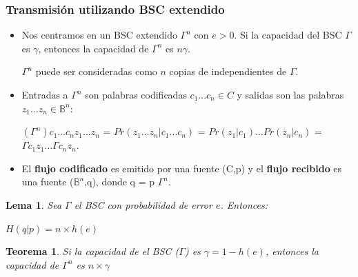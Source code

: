 \documentclass{beamer}
\theoremstyle{plain}
\newtheorem{teorema} [Teorema] {Teorema}
\newtheorem{lema} [theorem] {Lema}
\theoremstyle{example}
\theoremstyle{example}
\begin{document}
\begin{frame} \frametitle{Transmisión utilizando BSC extendido} \footnotesize  
\begin{itemize} 

\item Nos centramos en un BSC extendido $\Gamma^n$ con $e > 0$. Si la capacidad del BSC $\Gamma$  es $\gamma$, entonces la capacidad de $\Gamma^n$ es $n\gamma$.  

$\Gamma^n$ puede ser consideradas como $n$ copias de independientes de $\Gamma$.

\item  Entradas a $\Gamma^n$ son palabras codificadas $c_1 \ldots c_n \in C$ y  salidas son las palabras  $z_1 \ldots z_n \in \mathbb{B}^n$:
\begin{center}
$(\Gamma^n){c_1 \ldots c_n z_1 \ldots z_n}$ = $Pr(z_1 \ldots z_n | c_1 \ldots c_n)$ = $Pr(z_1 | c_1) \ldots Pr(z_n | c_n)$
= $\Gamma{c_1 z_1} \ldots  \Gamma{c_n z_n}$.
\end{center}

\item El \textbf{flujo codificado} es emitido por una fuente  (C,p) y  el \textbf{flujo recibido} es una fuente ($\mathbb{B}^n$,q), donde q = p $\Gamma^n$.

\end{itemize} 

\begin{lema}
Sea $\Gamma$ el BSC con probabilidad de error $e$. Entonces:  
\begin{center}
$H(q | p) = n \times h(e)$
\end{center}
\end{lema}

\begin{teorema}
Si la capacidad de el BSC ($\Gamma$) es $\gamma = 1- h(e)$, entonces la capacidad de $\Gamma^n$ es $n \times \gamma$
\end{teorema}
\end{frame} 
\end{document}
